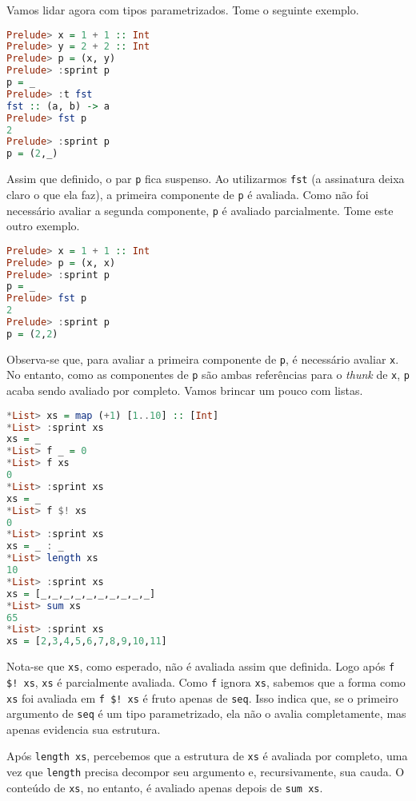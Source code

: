 \documentclass[a4paper]{article}
\begin{document}
Vamos lidar agora com tipos parametrizados.
Tome o seguinte exemplo.

\begin{lstlisting}[language=haskell, frame=single]
Prelude> x = 1 + 1 :: Int
Prelude> y = 2 + 2 :: Int
Prelude> p = (x, y)
Prelude> :sprint p
p = _
Prelude> :t fst
fst :: (a, b) -> a
Prelude> fst p
2
Prelude> :sprint p
p = (2,_)
\end{lstlisting}

Assim que definido, o par \texttt{p} fica suspenso.
Ao utilizarmos \texttt{fst} (a assinatura deixa claro o que ela faz), a primeira componente de \texttt{p} é avaliada.
Como não foi necessário avaliar a segunda componente, \texttt{p} é avaliado parcialmente.
Tome este outro exemplo.

\begin{lstlisting}[language=haskell, frame=single]
Prelude> x = 1 + 1 :: Int
Prelude> p = (x, x)
Prelude> :sprint p
p = _
Prelude> fst p
2
Prelude> :sprint p
p = (2,2)
\end{lstlisting}

Observa-se que, para avaliar a primeira componente de \texttt{p}, é necessário avaliar \texttt{x}.
No entanto, como as componentes de \texttt{p} são ambas referências para o \emph{thunk} de \texttt{x}, \texttt{p} acaba sendo avaliado por completo.
Vamos brincar um pouco com listas.

\begin{lstlisting}[language=haskell, frame=single]
*List> xs = map (+1) [1..10] :: [Int]
*List> :sprint xs
xs = _
*List> f _ = 0
*List> f xs
0
*List> :sprint xs
xs = _
*List> f $! xs
0
*List> :sprint xs
xs = _ : _
*List> length xs
10
*List> :sprint xs
xs = [_,_,_,_,_,_,_,_,_,_]
*List> sum xs
65
*List> :sprint xs
xs = [2,3,4,5,6,7,8,9,10,11]
\end{lstlisting}

Nota-se que \texttt{xs}, como esperado, não é avaliada assim que definida.
Logo após \texttt{f \$! xs}, \texttt{xs} é parcialmente avaliada.
Como \texttt{f} ignora \texttt{xs}, sabemos que a forma como \texttt{xs} foi avaliada em \texttt{f \$! xs} é fruto apenas de \texttt{seq}.
Isso indica que, se o primeiro argumento de \texttt{seq} é um tipo parametrizado, ela não o avalia completamente, mas apenas evidencia sua estrutura.

Após \texttt{length xs}, percebemos que a estrutura de \texttt{xs} é avaliada por completo, uma vez que \texttt{length} precisa decompor seu argumento e, recursivamente, sua cauda.
O conteúdo de \texttt{xs}, no entanto, é avaliado apenas depois de \texttt{sum xs}.
\end{document}
